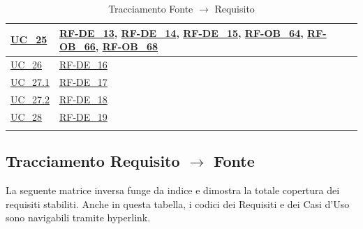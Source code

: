 \begin{longtable}{|>{\raggedright}p{}|>{\raggedright\arraybackslash}p{}|}
    \hline
    \hyperref[uc_25]{UC\_25} & \hyperlink{rf-de_13}{RF-DE\_13}, \hyperlink{rf-de_14}{RF-DE\_14}, \hyperlink{rf-de_15}{RF-DE\_15}, \hyperlink{rf-ob_64}{RF-OB\_64}, \hyperlink{rf-ob_66}{RF-OB\_66}, \hyperlink{rf-ob_68}{RF-OB\_68} \\
    \hline
    \hyperref[uc_26]{UC\_26} & \hyperlink{rf-de_16}{RF-DE\_16} \\
    \hline
    \hyperref[uc_27.1]{UC\_27.1} & \hyperlink{rf-de_17}{RF-DE\_17} \\
    \hline
    \hyperref[uc_27.2]{UC\_27.2} & \hyperlink{rf-de_18}{RF-DE\_18} \\
    \hline
    \hyperref[uc_28]{UC\_28} & \hyperlink{rf-de_19}{RF-DE\_19} \\
    \hline
    \caption{Tracciamento Fonte $\rightarrow$ Requisito}
\end{longtable}


\newpage
\subsection{Tracciamento Requisito $\rightarrow$ Fonte}
La seguente matrice inversa funge da indice e dimostra la totale copertura dei requisiti stabiliti. Anche in questa tabella, i codici dei Requisiti e dei Casi d'Uso sono navigabili tramite hyperlink.

